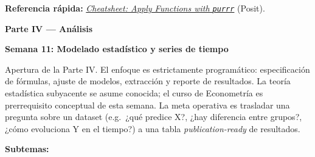 \documentclass[11pt,letterpaper]{article}
\newcommand{\parteCurso}[1]{%
  \clearpage%
  \vspace*{0.5cm}%
  {\centering\color{main}\fontsize{26pt}{32pt}\selectfont\bfseries #1\par}%
  \vspace{0.8cm}%
}
\newcommand{\semana}[2]{%
  \bigskip%
  {\color{main}\Large\bfseries Semana #1: #2\par}%
  \smallskip%
}
\newcommand{\cheatsheet}[2]{%
  \href{https://rstudio.github.io/cheatsheets/#1.pdf}{\textit{Cheatsheet: #2}}%
}
\begin{document}
\medskip
\noindent\textbf{Referencia rápida:} \cheatsheet{purrr}{Apply Functions with \texttt{purrr}} (Posit).

\parteCurso{Parte IV --- Análisis}

\semana{11}{Modelado estadístico y series de tiempo}

Apertura de la Parte IV. El enfoque es estrictamente programático: especificación de fórmulas, ajuste de modelos, extracción y reporte de resultados. La teoría estadística subyacente se asume conocida; el curso de Econometría es prerrequisito conceptual de esta semana. La meta operativa es trasladar una pregunta sobre un dataset (e.g.\ ¿qué predice X?, ¿hay diferencia entre grupos?, ¿cómo evoluciona Y en el tiempo?) a una tabla \textit{publication-ready} de resultados.

\textbf{Subtemas:}
\end{document}
